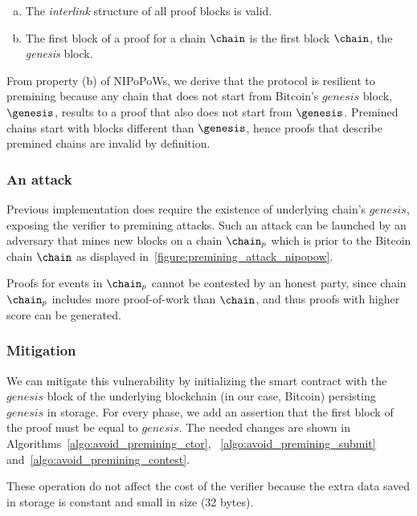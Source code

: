 \begin{enumerate}[(a)]

\item The \emph{interlink} structure of all proof blocks is valid.

\item The first block of a proof for a chain $\chain$ is the first block
    $\chain$, the \emph{genesis} block.

\end{enumerate}

From property (b) of NIPoPoWs, we derive that the protocol is resilient to
premining because any chain that does not start from Bitcoin's $genesis$ block,
$\genesis$, results to a proof that also does not start from $\genesis$. Premined
chains start with blocks different than $\genesis$, hence proofs that describe
premined chains are invalid by definition.

\subsubsection{An attack} Previous implementation does require the existence of
underlying chain's $genesis$, exposing the verifier to premining attacks. Such
an attack can be launched by an adversary that mines new blocks on a chain
$\chain_p$ which is prior to the Bitcoin chain $\chain$ as displayed
in~\ref{figure:premining_attack_nipopow}.


Proofs for events in $\chain_p$ cannot be contested by an honest party, since
chain $\chain_p$ includes more proof-of-work than $\chain$, and thus proofs
with higher score can be generated.

\subsubsection{Mitigation}

We can mitigate this vulnerability by initializing the smart contract with the
$genesis$ block of the underlying blockchain (in our case, Bitcoin) persisting
$genesis$ in storage. For every phase, we add an assertion that the first block
of the proof must be equal to $genesis$. The needed changes are shown in
Algorithms~\ref{algo:avoid_premining_ctor}, ~\ref{algo:avoid_premining_submit}
and~\ref{algo:avoid_premining_contest}.

These operation do not affect the cost of the verifier because the extra data
saved in storage is constant and small in size (32 bytes).

